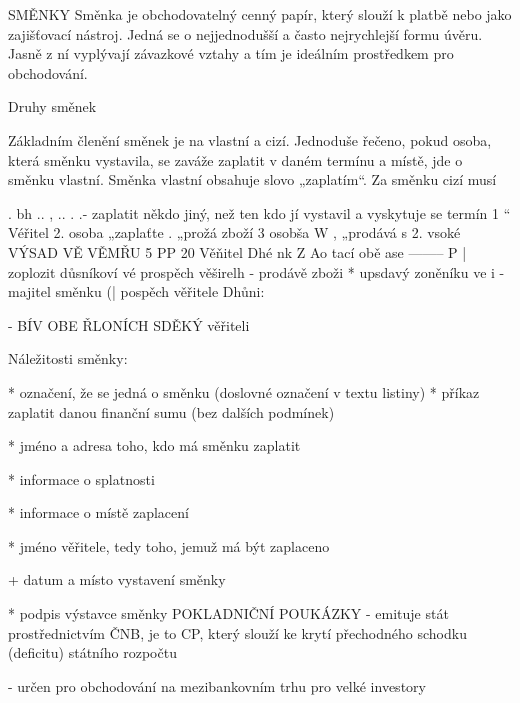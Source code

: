 SMĚNKY
Směnka je obchodovatelný cenný papír, který slouží k platbě nebo jako zajišťovací nástroj. Jedná se o nejjednodušší a
často nejrychlejší formu úvěru. Jasně z ní vyplývají závazkové vztahy a tím je ideálním prostředkem pro obchodování.

Druhy směnek

Základním členění směnek je na vlastní a cizí. Jednoduše řečeno, pokud osoba, která směnku vystavila, se zaváže
zaplatit v daném termínu a místě, jde o směnku vlastní. Směnka vlastní obsahuje slovo „zaplatím“. Za směnku cizí musí



























. bh .. , .. . .-
zaplatit někdo jiný, než ten kdo jí vystavil a vyskytuje se termín
1 “
Véřitel 2. osoba „zaplaťte .
„prožá zboží 3 osobša
W , „prodává s 2. vsoké VÝSAD VĚ VĚMŘU 5 PP 20
Věňitel Dhé nk Z Ao tací obě ase -------- P | zoplozit důsníkoví vé
prospěch věširelh
- prodávě zboži * upsdavý zoněníku ve i
- majitel směnku (| pospěch věřitele
Dhůni:

- BÍV OBE ŘLONÍCH SDĚKÝ
věřiteli







Náležitosti směnky:

* označení, že se jedná o směnku (doslovné označení v textu listiny)
* příkaz zaplatit danou finanční sumu (bez dalších podmínek)

* jméno a adresa toho, kdo má směnku zaplatit

* informace o splatnosti

* informace o místě zaplacení

* jméno věřitele, tedy toho, jemuž má být zaplaceno

+ datum a místo vystavení směnky

* podpis výstavce směnky
\newpage
POKLADNIČNÍ POUKÁZKY -
emituje stát prostřednictvím ČNB, je to CP, který slouží ke krytí přechodného schodku (deficitu) státního rozpočtu

- určen pro obchodování na mezibankovním trhu pro velké investory

